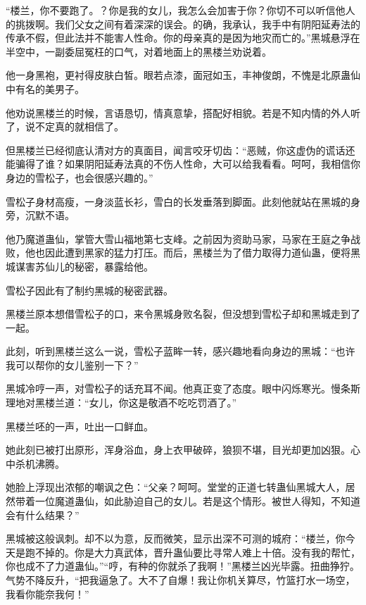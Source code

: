
\begin{this_body}

“楼兰，你不要跑了。？你是我的女儿，我怎么会加害于你？你切不可以听信他人的挑拨啊。我们父女之间有着深深的误会。的确，我承认，我手中有阴阳延寿法的传承不假，但此法并不能害人性命。你的母亲真的是因为地灾而亡的。”黑城悬浮在半空中，一副委屈冤枉的口气，对着地面上的黑楼兰劝说着。

他一身黑袍，更衬得皮肤白皙。眼若点漆，面冠如玉，丰神俊朗，不愧是北原蛊仙中有名的美男子。

他劝说黑楼兰的时候，言语恳切，情真意挚，搭配好相貌。若是不知内情的外人听了，说不定真的就相信了。

但黑楼兰已经彻底认清对方的真面目，闻言咬牙切齿：“恶贼，你这虚伪的谎话还能骗得了谁？如果阴阳延寿法真的不伤人性命，大可以给我看看。呵呵，我相信你身边的雪松子，也会很感兴趣的。”

雪松子身材高瘦，一身淡蓝长衫，雪白的长发垂落到脚面。此刻他就站在黑城的身旁，沉默不语。

他乃魔道蛊仙，掌管大雪山福地第七支峰。之前因为资助马家，马家在王庭之争战败，他也因此遭到黑家的猛力打压。而后，黑楼兰为了借力取得力道仙蛊，便将黑城谋害苏仙儿的秘密，暴露给他。

雪松子因此有了制约黑城的秘密武器。

黑楼兰原本想借雪松子的口，来令黑城身败名裂，但没想到雪松子却和黑城走到了一起。

此刻，听到黑楼兰这么一说，雪松子蓝眸一转，感兴趣地看向身边的黑城：“也许我可以帮你的女儿鉴别一下？”

黑城冷哼一声，对雪松子的话充耳不闻。他真正变了态度。眼中闪烁寒光。慢条斯理地对黑楼兰道：“女儿，你这是敬酒不吃吃罚酒了。”

黑楼兰呸的一声，吐出一口鲜血。

她此刻已被打出原形，浑身浴血，身上衣甲破碎，狼狈不堪，目光却更加凶狠。心中杀机沸腾。

她脸上浮现出浓郁的嘲讽之色：“父亲？呵呵。堂堂的正道七转蛊仙黑城大人，居然带着一位魔道蛊仙，如此胁迫自己的女儿。若是这个情形。被世人得知，不知道会有什么结果？”

黑城被这般讽刺。却不以为意，反而微笑，显示出深不可测的城府：“楼兰，你今天是跑不掉的。你是大力真武体，晋升蛊仙要比寻常人难上十倍。没有我的帮忙，你也成不了力道蛊仙。”“哼，有种的你就杀了我啊！”黑楼兰凶光毕露。扭曲狰狞。气势不降反升，“把我逼急了。大不了自爆！我让你机关算尽，竹篮打水一场空，我看你能奈我何！”


\end{this_body}
